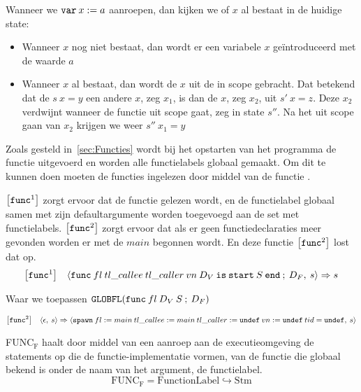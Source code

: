 Wanneer we \(\textnormal{\texttt{var}}\:x:= a\) aanroepen, dan kijken we of \(x\) al bestaat in de huidige state:
\begin{itemize}
  \item Wanneer \(x\) nog niet bestaat, dan wordt er een variabele \(x\) ge\"introduceerd met de waarde \(a\)
  \item Wanneer \(x\) al bestaat, dan wordt de \(x\) uit de  in scope gebracht. Dat betekend dat de \(s\:x = y\)
  een andere \(x\), zeg \(x_1\), is dan de \(x\), zeg \(x_2\), uit \(s'\:x = z\). Deze \(x_2\) verdwijnt wanneer de
  functie uit scope gaat, zeg in state \(s''\). Na het uit scope gaan van \(x_2\) krijgen we weer \(s''\:x_1 = y\)
\end{itemize}

Zoals gesteld in~\ref{sec:Functies} wordt bij het opstarten van het programma de functie  uitgevoerd
en worden alle functielabels globaal gemaakt. Om dit te kunnen doen moeten de functies ingelezen door middel van de
functie .

\(\left[\textnormal{\texttt{func}}^1\right]\) zorgt ervoor dat de functie gelezen wordt, en de functielabel globaal samen met zijn
defaultargumente worden toegevoegd aan de set met functielabels. \(\left[\textnormal{\texttt{func}}^2\right]\) zorgt ervoor dat als er
geen functiedeclaraties meer gevonden worden er met de \(main\) begonnen wordt. En deze functie
\(\left[\textnormal{\texttt{func}}^2\right]\) lost dat op.
\begin{eqnarray*}
\left[\kw{func}^1\right]&&
\langle\kw{func}\:fl\:tl\_callee\:tl\_caller\:vn\:D_V\:\kw{is}\:\kw{start}\:S\:\kw{end}
\:;\:D_F,\:s\rangle =>
s%
\end{eqnarray*}
\begin{flushright}
Waar we toepassen \(\textnormal{\texttt{GLOBFL}}(\textnormal{\texttt{func}}\:fl\:D_V\:S \:;\:D_F)\)
\end{flushright}

\begin{eqnarray*}
\left[\textnormal{\texttt{func}}^2\right]&&
\langle\epsilon,\:s\rangle =>
\langle\textnormal{\texttt{spawn}}\:fl:=main \:tl\_callee:=main \:tl\_caller:=\textnormal{\texttt{undef}}\:vn:=\textnormal{\texttt{undef}}\:tid=\textnormal{\texttt{undef}},\:s\rangle
\end{eqnarray*}


FUNC\(_\mathrm{F}\) haalt door middel van een aanroep aan de executieomgeving de statements op die de
functie-implementatie vormen, van de functie die globaal bekend is onder de naam van het argument, de functielabel.
\[
	\mathrm{FUNC}_\mathrm{F} = \mathrm{FunctionLabel} \hookrightarrow \mathrm{Stm}
\]

